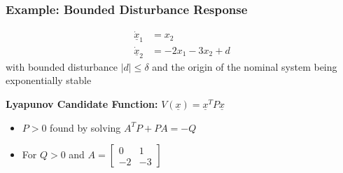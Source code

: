 \documentclass[student, noshadow, lsr, english, aspectratio=169, t]{ITR_LSR_slides}
\begin{document}
\begin{frame}
    \frametitle{Example: Bounded Disturbance Response}
	\vspace{-0.5cm}
    \begin{tcolorbox}[title=Problem: Analyze Boundedness of a Perturbed Mass-Spring-Damper-System]
		\vspace{-0.4cm}
        \begin{align*}
            \dot{\underline{x}}_1 &= x_2 \\ %
            \dot{\underline{x}}_2 &= -2x_1 - 3x_2 + d
        \end{align*}
        with bounded disturbance $|d| \leq \delta$ and the origin of the nominal system being exponentially stable
    \end{tcolorbox}

    \vspace{0.3cm}
    \textbf{Lyapunov Candidate Function:} $V(\underline{x}) = \underline{x}^T P \underline{x}$
    \begin{itemize}
        \item $P > 0$ found by solving $A^T P + P A = -Q$
        \vspace{0.2cm}
        \item For $Q>0$ and $A = \begin{bmatrix} 0 & 1 \\ -2 & -3 \end{bmatrix}$
    \end{itemize}

\end{frame}
\end{document}
